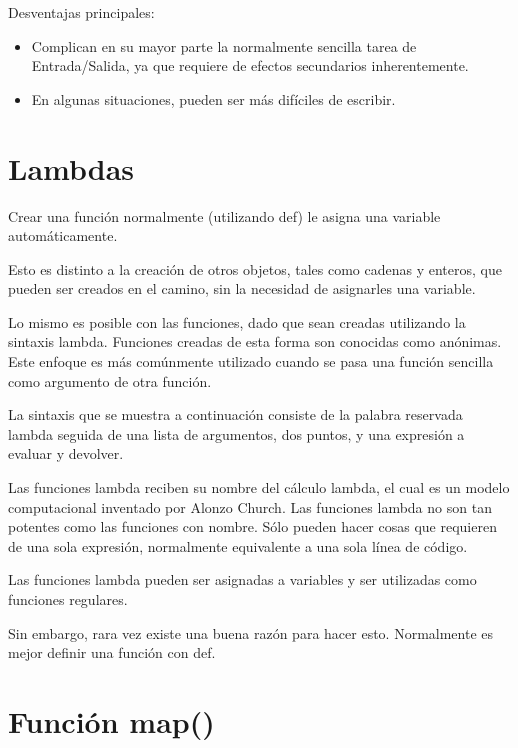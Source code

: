 \documentclass{report}
\begin{document}
Desventajas principales:

\begin{itemize}
  \item Complican en su mayor parte la normalmente sencilla tarea de Entrada/Salida, ya que requiere de efectos secundarios inherentemente.
  \item En algunas situaciones, pueden ser más difíciles de escribir.
\end{itemize}

\section{Lambdas}

Crear una función normalmente (utilizando def) le asigna una variable automáticamente.

Esto es distinto a la creación de otros objetos, tales como cadenas y enteros, que pueden ser creados en el camino, sin la necesidad de asignarles una variable.

Lo mismo es posible con las funciones, dado que sean creadas utilizando la sintaxis lambda. Funciones creadas de esta forma son conocidas como anónimas.
Este enfoque es más comúnmente utilizado cuando se pasa una función sencilla como argumento de otra función.

La sintaxis que se muestra a continuación consiste de la palabra reservada lambda seguida de una lista de argumentos, dos puntos, y una expresión a evaluar y devolver.

Las funciones lambda reciben su nombre del cálculo lambda, el cual es un modelo computacional inventado por Alonzo Church.
Las funciones lambda no son tan potentes como las funciones con nombre. Sólo pueden hacer cosas que requieren de una sola expresión, normalmente equivalente a una sola línea de código.



Las funciones lambda pueden ser asignadas a variables y ser utilizadas como funciones regulares.


Sin embargo, rara vez existe una buena razón para hacer esto. Normalmente es mejor definir una función con def.

\section{Función map()}
\end{document}
